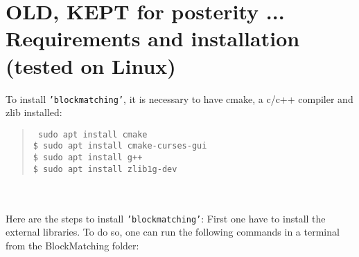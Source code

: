\documentclass[10pt,a4paper]{book}
\newcommand{\option}[1]{{\texttt{'#1'}}}
\newenvironment{code}[1]{\mbox{}\\[1ex]\hspace*{-#1cm}\begin{minipage}{150mm}\begin{quote}\tt}{\end{quote}\end{minipage}\mbox{}\\[1ex]}
\begin{document}
{\color{gray}
\section{OLD, KEPT for posterity ... Requirements and installation (tested on Linux)}
To install \option{blockmatching}, it is necessary to have cmake, a c/c++ compiler and zlib installed:
  \begin{code}{0.8}
    \$ sudo apt install cmake \\
    \$ sudo apt install cmake-curses-gui \\
    \$ sudo apt install g++ \\
    \$ sudo apt install zlib1g-dev
  \end{code}\\
  
Here are the steps to install \option{blockmatching}:
First one have to install the external libraries. To do so, one can run the following commands in a terminal from the BlockMatching folder:\\

}
\end{document}
